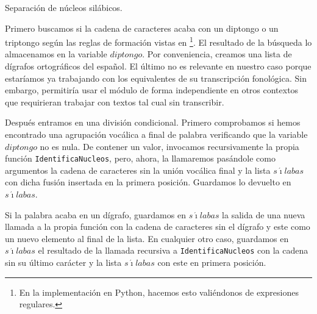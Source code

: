 \begin{algorithm}[!ht] %
	\caption{Separación de núcleos silábicos.}\label{list:dividefonemas}
\end{algorithm}

Primero buscamos si la cadena de caracteres acaba con un diptongo o un triptongo según las reglas de formación vistas en \footnote{En la implementación en Python, hacemos esto valiéndonos de expresiones regulares.}. El resultado de la búsqueda lo almacenamos en la variable $diptongo$. Por conveniencia, creamos una lista de dígrafos ortográficos del español. El último no es relevante en nuestro caso porque estaríamos ya trabajando con los equivalentes de su transcripción fonológica. Sin embargo, permitiría usar el módulo de forma independiente en otros contextos que requirieran trabajar con textos tal cual sin transcribir.

Después entramos en una división condicional. Primero comprobamos si hemos encontrado una agrupación vocálica a final de palabra verificando que la variable $diptongo$ no es nula. De contener un valor, invocamos recursivamente la propia función \texttt{IdentificaNucleos}, pero, ahora, la llamaremos pasándole como  argumentos la cadena de caracteres sin la unión vocálica final y la lista $s\acute{\imath}labas$ con dicha fusión insertada en la primera posición. Guardamos lo devuelto en  $s\acute{\imath}labas$.

Si la palabra acaba en un dígrafo, guardamos en  $s\acute{\imath}labas$ la salida de una nueva llamada a la propia función con la cadena de caracteres sin el dígrafo y este como un nuevo elemento al final de la lista. En cualquier otro caso, guardamos en  $s\acute{\imath}labas$ el resultado de la llamada recursiva a \texttt{IdentificaNucleos} con la cadena sin su último carácter y la lista  $s\acute{\imath}labas$ con este en primera posición.

